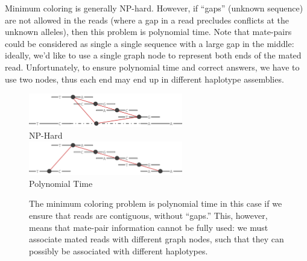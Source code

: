 \documentclass[11pt]{llncs}
\begin{document}
Minimum coloring is generally NP-hard. However, if ``gaps'' (unknown sequence) are not allowed in the reads (where a gap in a read precludes 
conflicts at the unknown alleles), then this problem is polynomial time. Note that mate-pairs could be considered as single a single sequence with a 
large gap in the middle: ideally, we'd like to use a single graph node to represent both ends of the mated read. Unfortunately, to ensure polynomial 
time and correct answers, we have to use two nodes, thus each end may end up in different haplotype assemblies.

\begin{figure}[!h]
\centering
   \includegraphics[width=0.6\textwidth]{graphics/mate-pair}\\
   NP-Hard\\
   \vspace{1em}
   \includegraphics[width=0.6\textwidth]{graphics/mate-pair_broken}\\
   Polynomial Time
   \caption{The minimum coloring problem is polynomial time in this case if we ensure that reads are contiguous, without ``gaps.'' This, however, 
   means that mate-pair information cannot be fully used: we must associate mated reads with different graph nodes, such that they can possibly
   be associated with different haplotypes.}
   \label{matePairs}
\end{figure}



\end{document}
